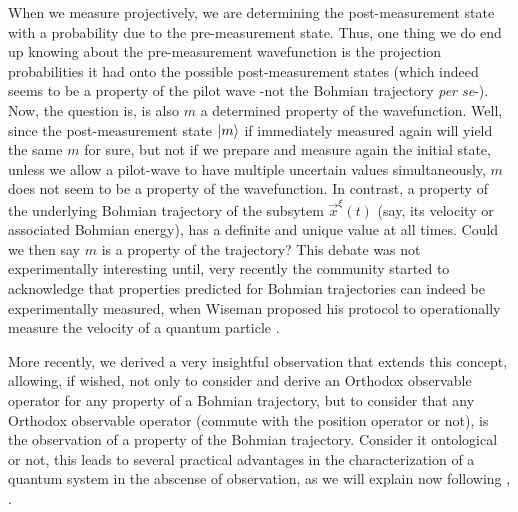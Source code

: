 \documentclass[11pt, a4paper]{article} %
\begin{document}
When we measure projectively, we are determining the post-measurement state with a probability due to the pre-measurement state. Thus, one thing we do end up knowing about the pre-measurement wavefunction is the projection probabilities it had onto the possible post-measurement states (which indeed seems to be a property of the pilot wave -not the Bohmian trajectory {\em per se}-). Now, the question is, is also $m$ a determined property of the wavefunction. Well, since the post-measurement state $\ket{m}$ if immediately measured again will yield the same $m$ for sure, but not if we prepare and measure again the initial state, unless we allow a pilot-wave to have multiple uncertain values simultaneously, $m$ does not seem to be a property of the wavefunction. In contrast, a property of the underlying Bohmian trajectory of the subsytem $\vec{x}^\xi(t)$ (say, its velocity or associated Bohmian energy), has a definite and unique value at all times. Could we then say $m$ is a property of the trajectory? This debate was not experimentally interesting until, very recently the community started to acknowledge that properties predicted for Bohmian trajectories can indeed be experimentally measured, when Wiseman proposed his protocol to operationally measure the velocity of a quantum particle \cite{WisemanVel}.

More recently, we derived a very insightful observation that extends this concept, allowing, if wished, not only to consider and derive an Orthodox observable operator for any property of a Bohmian trajectory, but to consider that any Orthodox observable operator (commute with the position operator or not), is the observation of a property of the Bohmian trajectory. Consider it ontological or not, this leads to several practical advantages in the characterization of a quantum system in the abscense of observation, as we will explain now following \cite{DevInPosition1},  \cite{DevInPosition2}.
\end{document}
